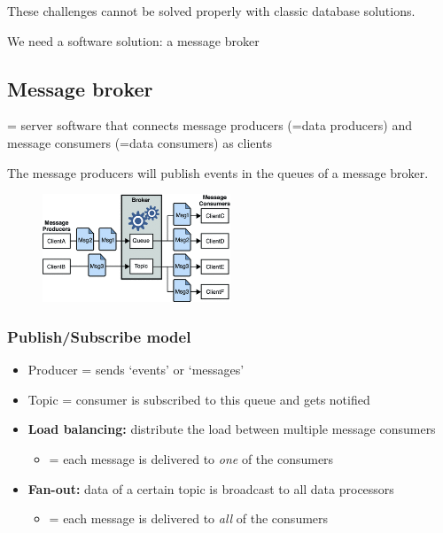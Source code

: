 \documentclass{article}
\begin{document}
These challenges cannot be solved properly with classic database solutions.

We need a software solution: a message broker

\subsection{Message broker}

= server software that connects message producers (=data producers) and message consumers (=data consumers) as clients

The message producers will publish events in the queues of a message broker.

\begin{figure}[H]
    \centering
    \includegraphics[width=0.5\textwidth]{publish-subscribe-model.png}
\end{figure}

\subsubsection{Publish/Subscribe model}

\begin{itemize}
    \item Producer = sends `events' or `messages'
    \item Topic = consumer is subscribed to this queue and gets notified
    \item \textbf{Load balancing:} distribute the load between multiple message consumers
    \begin{itemize}
        \item = each message is delivered to \textit{one} of the consumers
    \end{itemize}
    \item \textbf{Fan-out:} data of a certain topic is broadcast to all data processors
    \begin{itemize}
        \item = each message is delivered to \textit{all} of the consumers
    \end{itemize}
\end{itemize}
\end{document}
